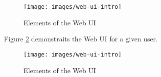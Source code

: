 \begin{figure}[!h]
	\centering
	\texttt{[image: images/web-ui-intro]}
	\caption{Elements of the Web UI}
	\label{fig:web-ui-intro}
\end{figure}

Figure \ref{fig:web-ui-example} demonstraits the Web UI for a given user.

\begin{figure}[!h]
	\centering
	\texttt{[image: images/web-ui-intro]}
	\caption{Elements of the Web UI}
	\label{fig:web-ui-example}
\end{figure}